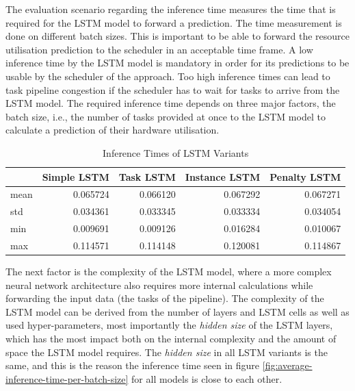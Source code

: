    The evaluation scenario regarding the inference time measures the time that is required for the LSTM model to forward a prediction.
    The time measurement is done on different batch sizes. This is important to be able to forward the resource utilisation prediction to the scheduler in an acceptable time frame.
    A low inference time by the LSTM model is mandatory in order for its predictions to be usable by the scheduler of the  approach. Too high inference times can lead to task pipeline congestion if the scheduler has to wait for tasks to arrive from the LSTM model.
    The required inference time depends on three major factors, the batch size, i.e., the number of tasks provided at once to the LSTM model to calculate a prediction of their hardware utilisation.

    \begin{table}
      \centering
      \caption{Inference Times of LSTM Variants}
      \label{tab:inference-time-of-lstm-variants}
      \begin{tabular}{|l|rrrr|}
        \toprule
        {} &  Simple LSTM &  Task LSTM &  Instance LSTM &  Penalty LSTM \\
        \midrule
        mean  &     0.065724 &   0.066120 &       0.067292 &      0.067271 \\
        std   &     0.034361 &   0.033345 &       0.033334 &      0.034054 \\
        min   &     0.009691 &   0.009126 &       0.016284 &      0.010067 \\
        max   &     0.114571 &   0.114148 &       0.120081 &      0.114867 \\
        \bottomrule
      \end{tabular}
    \end{table}
    The next factor is the complexity of the LSTM model, where a more complex neural network architecture also requires more internal calculations while forwarding the input data (the tasks of the pipeline). The complexity of the LSTM model can be derived from the number of layers and LSTM cells as well as used hyper-parameters, most importantly the \emph{hidden size} of the LSTM layers, which has the most impact both on the internal complexity and the amount of space the LSTM model requires. The \emph{hidden size} in all LSTM variants is the same, and this is the reason the inference time seen in figure \ref{fig:average-inference-time-per-batch-size} for all models is close to each other.

